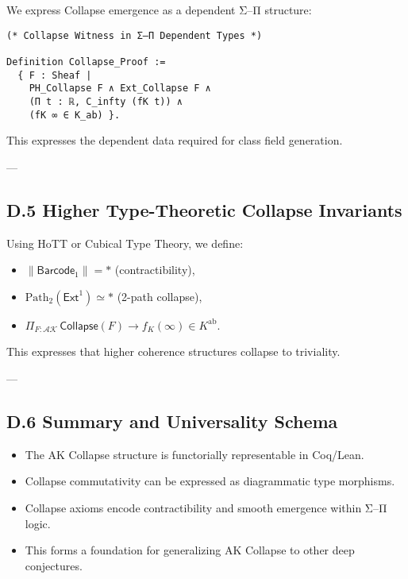 \documentclass[11pt]{article}
\begin{document}
We express Collapse emergence as a dependent Σ–Π structure:

\begin{lstlisting}[language=Coq, caption=Σ–Π Collapse Encoding]
(* Collapse Witness in Σ–Π Dependent Types *)

Definition Collapse_Proof :=
  { F : Sheaf |
    PH_Collapse F ∧ Ext_Collapse F ∧ 
    (Π t : ℝ, C_infty (fK t)) ∧ 
    (fK ∞ ∈ K_ab) }.
\end{lstlisting}

This expresses the dependent data required for class field generation.

---

\subsection*{D.5 Higher Type-Theoretic Collapse Invariants}

Using HoTT or Cubical Type Theory, we define:

\begin{itemize}
  \item \( \| \mathsf{Barcode}_1 \| = \ast \) (contractibility),
  \item \( \mathrm{Path}_2(\mathsf{Ext}^1) \simeq \ast \) (2-path collapse),
  \item \( \Pi_{F : \mathcal{AK}}\, \mathsf{Collapse}(F) \to f_K(\infty) \in K^{\mathrm{ab}} \).
\end{itemize}

This expresses that higher coherence structures collapse to triviality.

---

\subsection*{D.6 Summary and Universality Schema}

\begin{itemize}
    \item The AK Collapse structure is functorially representable in Coq/Lean.
    \item Collapse commutativity can be expressed as diagrammatic type morphisms.
    \item Collapse axioms encode contractibility and smooth emergence within Σ–Π logic.
    \item This forms a foundation for generalizing AK Collapse to other deep conjectures.
\end{itemize}
\end{document}
